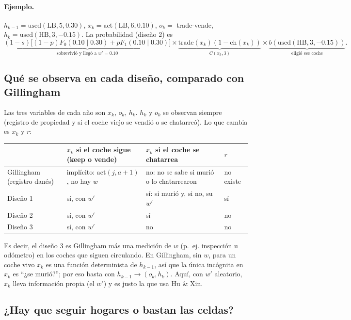 \documentclass[11pt]{article}
\newcommand{\act}{\mathrm{act}}
\newcommand{\used}{\mathrm{used}}
\newcommand{\buy}{b}
\newcommand{\1}{\mathbf{1}}
\begin{document}
\paragraph{Ejemplo.} $h_{k-1}=\used(\text{LB},5,0.30)$, $x_k=\act(\text{LB},6,0.10)$,
$o_k=$ trade-vende, $h_k=\used(\text{HB},3,-0.15)$. La probabilidad (diseño 2) es
\[
  \underbrace{(1-s)\bigl[(1-p)F_0(0.10\mid 0.30)+pF_1(0.10\mid 0.30)\bigr]}_{\text{sobrevivió y llegó a } w'=0.10}
  \times\underbrace{\text{trade}(x_k)(1-\text{ch}(x_k))}_{C(x_k,3)}
  \times\underbrace{\buy(\used(\text{HB},3,-0.15))}_{\text{eligió ese coche}}.
\]

\subsection{Qué se observa en cada diseño, comparado con Gillingham}

Las tres variables de cada año son $x_k$, $o_k$, $h_k$. $h_k$ y $o_k$ se observan siempre
(registro de propiedad y si el coche viejo se vendió o se chatarreó). Lo que cambia es $x_k$
y $r$:

\begin{center}
\small
\begin{tabularx}{\textwidth}{l>{\raggedright\arraybackslash}X>{\raggedright\arraybackslash}X>{\raggedright\arraybackslash}X}
\toprule
 & $x_k$ si el coche sigue (keep o vende) & $x_k$ si el coche se chatarrea & $r$\\
\midrule
Gillingham (registro danés) & implícito: $\act(j,a+1)$, no hay $w$ & no: no se sabe si murió o lo chatarrearon & no existe\\
Diseño 1 & sí, con $w'$ & sí: si murió y, si no, su $w'$ & sí\\
Diseño 2 & sí, con $w'$ & sí & no\\
Diseño 3 & sí, con $w'$ & no & no\\
\bottomrule
\end{tabularx}
\end{center}

\noindent Es decir, el diseño 3 es Gillingham más una medición de $w$ (p.~ej. inspección u
odómetro) en los coches que siguen circulando. En Gillingham, sin $w$, para un coche vivo
$x_k$ es una función determinista de $h_{k-1}$, así que la única incógnita en $x_k$ es
``¿se murió?''; por eso basta con $h_{k-1}\to(o_k,h_k)$. Aquí, con $w'$ aleatorio, $x_k$
lleva información propia (el $w'$) y es justo la que usa Hu \& Xin.

\subsection{¿Hay que seguir hogares o bastan las celdas?}
\end{document}
